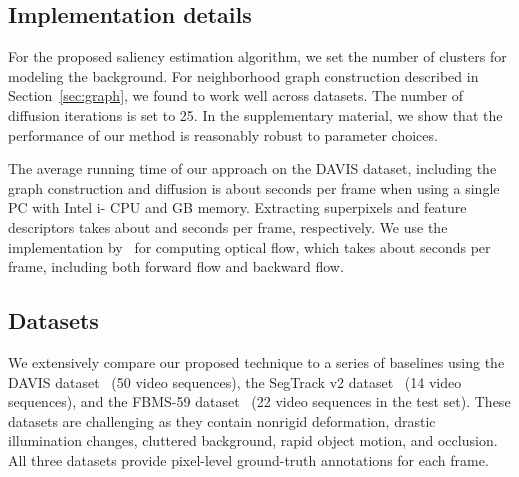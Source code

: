 \documentclass[runningheads]{llncs}
\begin{document}
\subsection{Implementation details}
For the proposed saliency estimation algorithm, we set the number of clusters  for modeling the background. 
For neighborhood graph construction described in Section~\ref{sec:graph}, we  found  to work well across datasets.  The number of diffusion iterations is set to 25.
In the supplementary material, we show that the performance of our method is reasonably robust to parameter choices. 


The average running time of our approach on the DAVIS dataset, including the graph construction and diffusion is about  seconds per frame when using a single PC with Intel i- CPU and  GB memory. 
Extracting superpixels and feature descriptors takes about  and  seconds per frame, respectively. 
We use the implementation by~\cite{hu2016efficient,RevaudCVPR2015} for computing optical flow, which takes about  seconds per frame, including both forward flow and backward flow. 


\subsection{Datasets}
We extensively compare our proposed technique to a series of baselines using the DAVIS dataset~\cite{PerazziCVPR16} (50 video sequences), the SegTrack v2 dataset~\cite{LiICCV13} (14 video sequences), and the FBMS-59 dataset~\cite{OchsPAMI2014} (22 video sequences in the test set).
These datasets are challenging as they contain nonrigid deformation, drastic illumination changes, cluttered background, rapid object motion, and occlusion. 
All three datasets provide pixel-level ground-truth annotations for each frame. 

\iffalse
The DAVIS dataset provides pixel-level ground-truth annotations for each frame and also the attributes specifying the challenges for every video. Following the evaluation in~\cite{PerazziCVPR16}, we use p video sequences for evaluation. The SegTrack v2 and the FBMS-59 dataset provide pixel-level ground-truth annotations as well. The DAVIS dataset is composed of  videos () having on average  frames. The average size of the groundtruth foreground object occupies around  of the size of the frame. Similarly, the SegTrack v2 dataset consists of  videos having on average  frames. To ensure fairness we use the same subset of  videos as~\cite{FaktorBMVC14}. The average size of the groundtruth foreground objects for the SegTrack v2 dataset is about  of the size of the frame. Besides the oftentimes small sized foreground objects, the dataset contains non-rigid deformation, drastic illumination changes, cluttered background, rapid object motion and occlusion. {\color{blue}Because of those challenges, both datasets serve as a good benchmark for evaluation.} {\color{red}missing description of third dataset}
\fi
\end{document}
